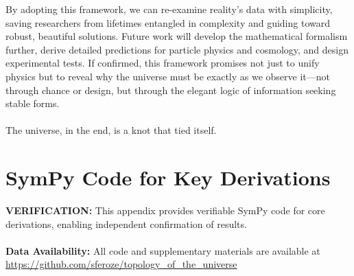 \documentclass{article}
\begin{document}
By adopting this framework, we can re-examine reality's data with simplicity, saving researchers from lifetimes entangled in complexity and guiding toward robust, beautiful solutions. Future work will develop the mathematical formalism further, derive detailed predictions for particle physics and cosmology, and design experimental tests. If confirmed, this framework promises not just to unify physics but to reveal why the universe must be exactly as we observe it—not through chance or design, but through the elegant logic of information seeking stable forms.
\\
\\
The universe, in the end, is a knot that tied itself.
\\


\appendix
\section{SymPy Code for Key Derivations}
\textbf{VERIFICATION:} This appendix provides verifiable SymPy code for core derivations, enabling independent confirmation of results.
\\
\\
\textbf{Data Availability:} All code and supplementary materials are available at \url{https://github.com/sferoze/topology_of_the_universe}
\\
\end{document}
